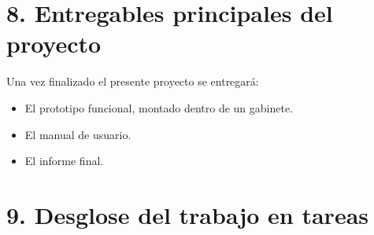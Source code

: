 \documentclass[
11pt, %
]{charter}
\begin{document}
\section{8. Entregables principales del proyecto}
\label{sec:entregables}

Una vez finalizado el presente proyecto se entregará:

\begin{itemize}
	\item El prototipo funcional, montado dentro de un gabinete.
	\item El manual de usuario.
	\item El informe final.
\end{itemize}

\section{9. Desglose del trabajo en tareas}
\label{sec:wbs}
\end{document}
